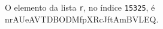 \documentclass[12pt,varwidth=16cm,border=1pt]{standalone}
\begin{document}
O elemento da lista \verb+r+, no índice \verb+15325+, é nrAUeAVTDBODMfpXRcJftAmBVLEQ.

\questiomtrue
\end{document}

